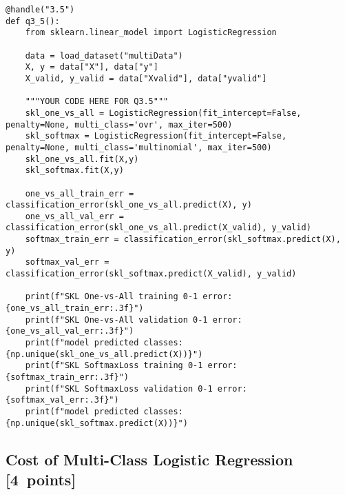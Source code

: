 \documentclass{article}
\newcommand\pts[1]{\textcolor{pointscolour}{[#1~points]}}
\begin{document}
\begin{verbatim}
@handle("3.5")
def q3_5():
    from sklearn.linear_model import LogisticRegression

    data = load_dataset("multiData")
    X, y = data["X"], data["y"]
    X_valid, y_valid = data["Xvalid"], data["yvalid"]

    """YOUR CODE HERE FOR Q3.5"""
    skl_one_vs_all = LogisticRegression(fit_intercept=False, penalty=None, multi_class='ovr', max_iter=500)
    skl_softmax = LogisticRegression(fit_intercept=False, penalty=None, multi_class='multinomial', max_iter=500)
    skl_one_vs_all.fit(X,y)
    skl_softmax.fit(X,y)

    one_vs_all_train_err = classification_error(skl_one_vs_all.predict(X), y)
    one_vs_all_val_err = classification_error(skl_one_vs_all.predict(X_valid), y_valid)
    softmax_train_err = classification_error(skl_softmax.predict(X), y)
    softmax_val_err = classification_error(skl_softmax.predict(X_valid), y_valid)

    print(f"SKL One-vs-All training 0-1 error: {one_vs_all_train_err:.3f}")
    print(f"SKL One-vs-All validation 0-1 error: {one_vs_all_val_err:.3f}")
    print(f"model predicted classes: {np.unique(skl_one_vs_all.predict(X))}")
    print(f"SKL SoftmaxLoss training 0-1 error: {softmax_train_err:.3f}")
    print(f"SKL SoftmaxLoss validation 0-1 error: {softmax_val_err:.3f}")
    print(f"model predicted classes: {np.unique(skl_softmax.predict(X))}")
\end{verbatim}

\newpage

\subsection{Cost of Multi-Class Logistic Regression \pts{4}}
\end{document}
